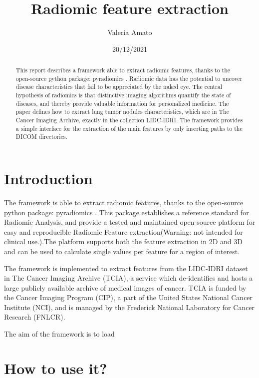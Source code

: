 \documentclass[12pt]{article}
\begin{document}
	\title {Radiomic feature extraction}
	\author {Valeria Amato}
	\date{20/12/2021}

	\maketitle

	\begin{abstract}
This report describes a framework able to extract radiomic features, thanks to the open-source python package: pyradiomics \cite{pyradiomics}.
Radiomic data has the potential to uncover disease characteristics that fail to be appreciated by the naked eye.
The central hypothesis of radiomics is that distinctive imaging algorithms quantify the state of diseases, and thereby provide valuable information for personalized medicine. 
The paper defines how to extract lung tumor nodules characteristics, which are in The Cancer Imaging Archive, exactly in the collection LIDC-IDRI.
The framework provides a simple interface for the extraction of the main features by only inserting paths to the DICOM directories.
	\end{abstract}

	\section{Introduction}\label{sec:intro}
The framework is able to extract radiomic features, thanks to the open-source python package: pyradiomics \cite{pyradiomics}. 
This package establishes a reference standard for Radiomic Analysis, and provide a tested and maintained open-source platform for easy and reproducible Radiomic Feature extraction(Warning: not intended for clinical use.).The platform supports both the feature extraction in 2D and 3D and can be used to calculate single values per feature for a region of interest.

The framework is implemented to extract features from the LIDC-IDRI dataset in The Cancer Imaging Archive (TCIA), a service which de-identifies and hosts a large publicly available archive of medical images of cancer.  TCIA is funded by the Cancer Imaging Program (CIP), a part of the United States  National Cancer Institute (NCI), and is managed by the Frederick National Laboratory for Cancer Research (FNLCR).

The aim of the framework  is to load 
	\pagebreak

	\section{How to use it?}\label{sec:use}
\end{document}
